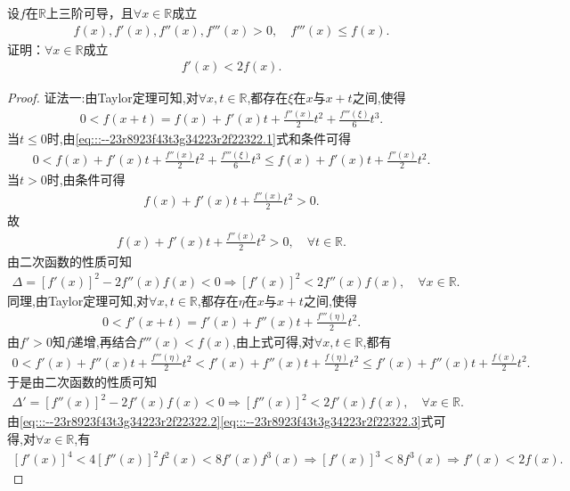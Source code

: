 \documentclass[../../main.tex]{subfiles}%
\begin{document}
\begin{example}
设$f$在$\mathbb{R}$上三阶可导，且$\forall x\in\mathbb{R}$成立
\begin{align*}
f(x),f'(x),f''(x),f'''(x)>0,\quad f'''(x)\leqslant f(x).
\end{align*}
证明：$\forall x\in\mathbb{R}$成立
\begin{align*}
f'(x)<2f(x).
\end{align*}
\end{example}
\begin{proof}

{\color{blue}证法一:}由Taylor定理可知,对$\forall x,t\in \mathbb{R}$,都存在$\xi$在$x$与$x+t$之间,使得
\begin{align}
0<f(x+t)=f(x)+f'(x)t+\frac{f''(x)}{2}t^2+\frac{f'''(\xi)}{6}t^3. \label{eq:::--23r8923f43t3g34223r2f22322.1}
\end{align}
当$t\leqslant 0$时,由\eqref{eq:::--23r8923f43t3g34223r2f22322.1}式和条件可得
\begin{align*}
0<f(x)+f'(x)t+\frac{f''(x)}{2}t^2+\frac{f'''(\xi)}{6}t^3\leqslant f(x)+f'(x)t+\frac{f''(x)}{2}t^2.
\end{align*}
当$t>0$时,由条件可得
\begin{align*}
f(x)+f'(x)t+\frac{f''(x)}{2}t^2>0.
\end{align*}
故
\begin{align*}
f(x)+f'(x)t+\frac{f''(x)}{2}t^2>0,\quad \forall t\in \mathbb{R}.
\end{align*}
由二次函数的性质可知
\begin{align}
\Delta =\left[ f'(x) \right]^2-2f''(x)f(x)<0\Longrightarrow \left[ f'(x) \right]^2<2f''(x)f(x),\quad \forall x\in \mathbb{R}. \label{eq:::--23r8923f43t3g34223r2f22322.2}
\end{align}
同理,由Taylor定理可知,对$\forall x,t\in \mathbb{R}$,都存在$\eta$在$x$与$x+t$之间,使得
\begin{align*}
0<f'(x+t)=f'(x)+f''(x)t+\frac{f'''(\eta)}{2}t^2.
\end{align*}
由$f'>0$知$f$递增,再结合$f'''(x)<f(x)$,由上式可得,对$\forall x,t\in \mathbb{R}$,都有
\begin{align*}
0<f'(x)+f''(x)t+\frac{f'''(\eta)}{2}t^2<f'(x)+f''(x)t+\frac{f(\eta)}{2}t^2\leqslant f'(x)+f''(x)t+\frac{f(x)}{2}t^2.
\end{align*}
于是由二次函数的性质可知
\begin{align}
\Delta' =\left[ f''(x) \right]^2-2f'(x)f(x)<0\Longrightarrow \left[ f''(x) \right]^2<2f'(x)f(x),\quad \forall x\in \mathbb{R}. \label{eq:::--23r8923f43t3g34223r2f22322.3}
\end{align}
由\eqref{eq:::--23r8923f43t3g34223r2f22322.2}\eqref{eq:::--23r8923f43t3g34223r2f22322.3}式可得,对$\forall x\in \mathbb{R}$,有
\begin{align*}
\left[ f'(x) \right]^4<4\left[ f''(x) \right]^2f^2(x)<8f'(x)f^3(x)\Longrightarrow \left[ f'(x) \right]^3<8f^3(x)\Longrightarrow f'(x)<2f(x).
\end{align*}


\end{proof}
\end{document}
